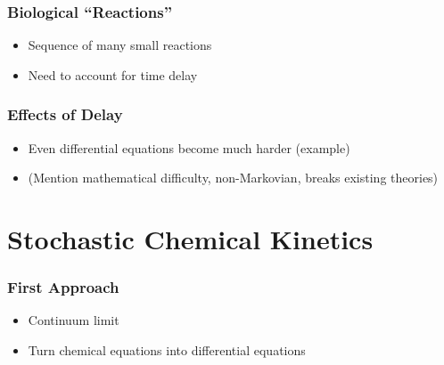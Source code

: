 \documentclass[xcolor={usenames,dvipsnames,svgnames}]{beamer}
\begin{document}
\begin{frame}
    \frametitle{Biological ``Reactions''}
    \begin{itemize}
        \item Sequence of many small reactions
        \item Need to account for time delay
    \end{itemize}
    \begin{center}
        
    \end{center}
\end{frame}

\begin{frame}
    \frametitle{Effects of Delay}
    \begin{itemize}
        \item Even differential equations become much harder (example)
        \item (Mention mathematical difficulty, non-Markovian, breaks existing theories)
    \end{itemize}
\end{frame}


\section{Stochastic Chemical Kinetics} %
\label{sec:modeling}

\begin{frame}
    \frametitle{First Approach}
    \begin{itemize}
        \item Continuum limit
        \item Turn chemical equations into differential equations
    \end{itemize}
\end{frame}
\end{document}
